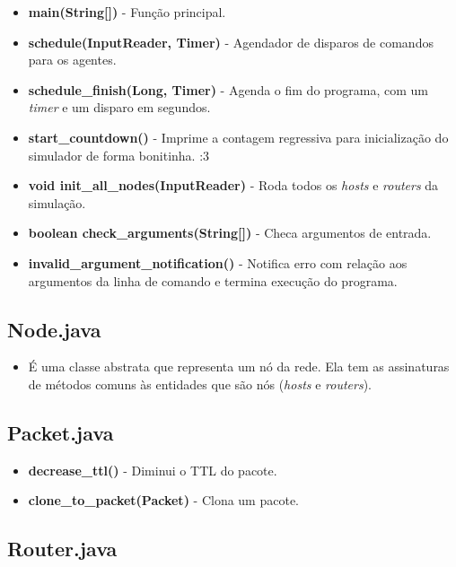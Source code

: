 \documentclass[11pt]{article}
\begin{document}
\begin{itemize}
	\item \textbf{main(String[])} - Função principal.
	\item \textbf{schedule(InputReader, Timer)} - Agendador de disparos de comandos para os agentes.
	\item \textbf{schedule\_finish(Long, Timer)} - Agenda o fim do programa, com um \textit{timer} e um disparo em segundos.
	\item \textbf{start\_countdown()} - Imprime a contagem regressiva para inicialização do simulador de forma bonitinha. :3
	\item \textbf{void init\_all\_nodes(InputReader)} - Roda todos os \textit{hosts} e \textit{routers} da simulação.
	\item \textbf{boolean check\_arguments(String[])} - Checa argumentos de entrada.
	\item \textbf{invalid\_argument\_notification()} - Notifica erro com relação aos argumentos da linha de comando e termina execução do programa.
\end{itemize}

\subsection{Node.java}

\begin{itemize}
	\item É uma classe abstrata que representa um nó da rede. Ela tem as assinaturas de métodos comuns às entidades que são nós (\textit{hosts} e \textit{routers}).
\end{itemize}


\subsection{Packet.java}

\begin{itemize}
	\item \textbf{decrease\_ttl()} - Diminui o TTL do pacote.
	\item \textbf{clone\_to\_packet(Packet)} - Clona um pacote.
\end{itemize}

\subsection{Router.java}
\end{document}
